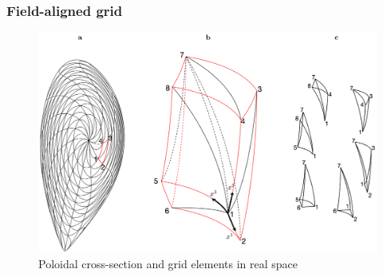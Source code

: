 \documentclass{beamer}
\begin{document}

\begin{frame}
\frametitle{Field-aligned grid}
\vspace{-0.7cm}
\begin{center}
	\begin{figure}
		\includegraphics[trim={0cm 2cm 0cm 0cm},clip,width=1\textwidth]{FIGURES/curvilinear_grid_02.eps}
		\caption{Poloidal cross-section and grid elements in real space}
	\end{figure}
\end{center}
\end{frame}
\end{document}
